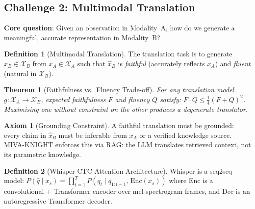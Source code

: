 \documentclass[12pt,a4paper]{article}
\theoremstyle{definition}
\newtheorem{definition}{Definition}[section]
\newtheorem{axiom}{Axiom}[section]
\theoremstyle{plain}
\newtheorem{theorem}{Theorem}[section]
\theoremstyle{remark}
\begin{document}
\subsection{Challenge 2: Multimodal Translation}

\begin{tcolorbox}[challengebox,title={Challenge 2: Translation}]
\textbf{Core question}: Given an observation in Modality~A, how do we generate a meaningful, accurate representation in Modality~B?
\end{tcolorbox}

\begin{definition}[Multimodal Translation]
The translation task is to generate $\hat{x}_B \in \mathcal{X}_B$ from $x_A \in \mathcal{X}_A$ such that $\hat{x}_B$ is \emph{faithful} (accurately reflects $x_A$) and \emph{fluent} (natural in $\mathcal{X}_B$).
\end{definition}

\begin{theorem}[Faithfulness vs.\ Fluency Trade-off]
For any translation model $g : \mathcal{X}_A \to \mathcal{X}_B$, expected faithfulness $F$ and fluency $Q$ satisfy:
$F \cdot Q \le \frac{1}{4}(F + Q)^2$.
Maximising one without constraint on the other produces a degenerate translator.
\end{theorem}

\begin{axiom}[Grounding Constraint]
\label{ax:grounding}
A faithful translation must be grounded: every claim in $\hat{x}_B$ must be inferable from $x_A$ or a verified knowledge source. MIVA-KNIGHT enforces this via RAG: the LLM translates retrieved context, not its parametric knowledge.
\end{axiom}

\begin{definition}[Whisper CTC-Attention Architecture]
Whisper is a seq2seq model: $P(\hat{q} \mid x_s) = \prod_{t=1}^T P(q_t \mid q_{1:t-1},\, \text{Enc}(x_s))$ where Enc is a convolutional + Transformer encoder over mel-spectrogram frames, and Dec is an autoregressive Transformer decoder.
\end{definition}
\end{document}
